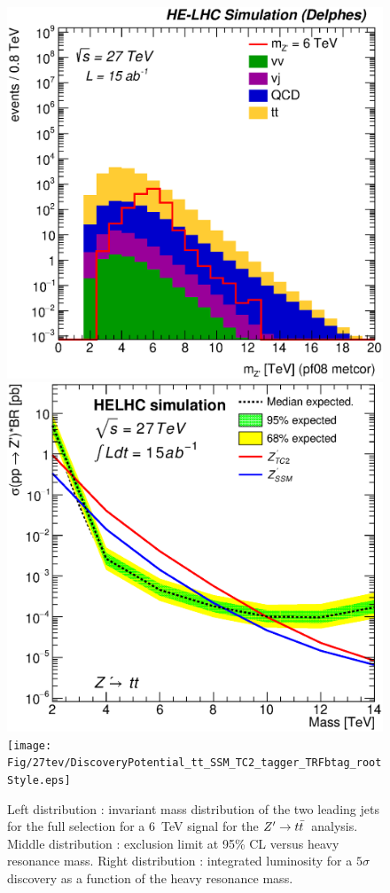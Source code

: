 \documentclass{cernrep}
\newcommand*{\zptt}{\ensuremath{Z^{\prime} \rightarrow \ttbar}}
\begin{document}
\begin{figure}
  \centering
  \includegraphics[width=0.30\columnwidth]{Fig/27tev/Zptt_Mj1j2_pf08_MetCorr_fit_sel8_nostack_log.eps}
  \includegraphics[width=0.30\columnwidth]{Fig/27tev/lim_Zprime_tt_helhc_v01.eps}
  \texttt{[image: Fig/27tev/DiscoveryPotential\_tt\_SSM\_TC2\_tagger\_TRFbtag\_rootStyle.eps]}
  \caption{Left distribution : invariant mass distribution of the two leading jets for the full selection for a 6~TeV signal for the \zptt\ analysis. Middle distribution : exclusion limit at 95\% CL versus heavy resonance mass. Right distribution : integrated luminosity for a $5\sigma$ discovery as a function of the heavy resonance mass.}
  \label{figure:hadronicresonances27:ttsel08}
\end{figure}

\begin{table}[!htb]\centering
{}
\caption{Final yield of analysis.}
\label{tab:ZpttYield27}
\end{table}
\end{document}
